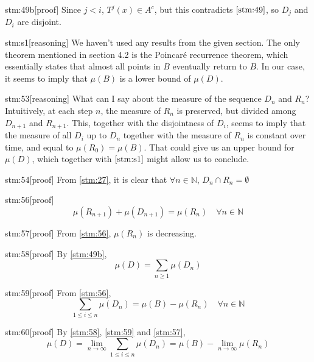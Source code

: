\documentclass{article}
\begin{document}
\begin{stm}{stm:49b}[proof]
Since $j < i$, $T^j(x) \in A^c$, but this contradicts $\ref{stm:49}$, so $D_j$ and $D_i$ are disjoint.
\end{stm}

\begin{stm}{stm:s1}[reasoning]
We haven't used any results from the given section. The only theorem mentioned in section 4.2 is the Poincaré recurrence theorem, which essentially states that almost all points in $B$ eventually return to $B$. In our case, it seems to imply that $\mu(B)$ is a lower bound of $\mu(D)$. 
\end{stm}

\begin{stm}{stm:53}[reasoning]
What can I say about the measure of the sequence $D_n$ and $R_n$? Intuitively, at each step $n$, the measure of $R_n$ is preserved, but divided among $D_{n+1}$ and $R_{n+1}$. This, together with the disjointness of $D_i$, seems to imply that the measure of all $D_i$ up to $D_n$ together with the measure of $R_n$ is constant over time, and equal to $\mu(R_0) = \mu(B)$. That could give us an upper bound for $\mu(D)$, which together with $\ref{stm:s1}$ might allow us to conclude.
\end{stm}

\begin{stm}{stm:54}[proof]
From \ref{stm:27}, it is clear that $\forall n \in \mathbb{N}$, $D_n \cap R_n = \emptyset$
\end{stm}

\begin{stm}{stm:56}[proof]
\[
\mu(R_{n+1}) + \mu(D_{n+1}) = \mu(R_n) \quad \forall n \in \mathbb{N}
\]
\end{stm}

\begin{stm}{stm:57}[proof]
From \ref{stm:56}, $\mu(R_n)$ is decreasing.
\end{stm}

\begin{stm}{stm:58}[proof]
By \ref{stm:49b}, 
\[
\mu(D) = \sum_{n \ge 1} \mu(D_n)
\]
\end{stm}

\begin{stm}{stm:59}[proof]
From \ref{stm:56},
\[
\sum_{1 \le i \le n} \mu(D_n) = \mu(B) - \mu(R_n) \quad \forall n \in \mathbb{N}
\]
\end{stm}

\begin{stm}{stm:60}[proof]
By \ref{stm:58}, \ref{stm:59} and \ref{stm:57},
\[
\mu(D) = \lim_{n \to \infty} \sum_{1 \le i \le n} \mu(D_n) = \mu(B) - \lim_{n \to \infty} \mu(R_n)
\]
\end{stm}
\end{document}
